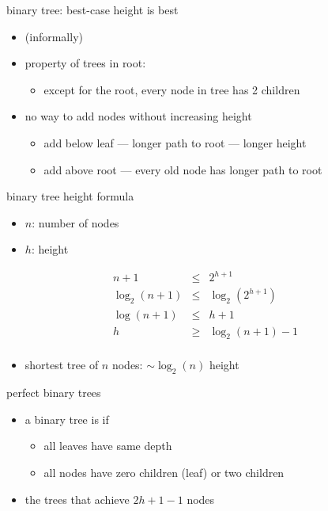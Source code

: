 \begin{frame}{binary tree: best-case height is best}
\begin{itemize}
\item (informally)
\item property of trees in root:
    \begin{itemize}
        \item except for the root, every node in tree has 2 children
    \end{itemize}
\item no way to add nodes without increasing height
    \begin{itemize}
    \item add below leaf --- longer path to root --- longer height
    \item add above root --- every old node has longer path to root
    \end{itemize}
\end{itemize}
\end{frame}


\begin{frame}{binary tree height formula}
    \begin{itemize}
    \item $n$: number of nodes
    \item $h$: height
    \end{itemize}
\begin{eqnarray*}
    n + 1 &\le& 2^{h+1} \\
    \log_2(n+1) &\le& \log_2\left(2^{h+1}\right) \\
    \log(n+1) &\le& h+1 \\
    h &\ge& \log_2\left(n+1\right)-1 \\
\end{eqnarray*}
    \begin{itemize}
    \item shortest tree of $n$ nodes: $\sim \log_2(n)$ height
    \end{itemize}
\end{frame}

\begin{frame}{perfect binary trees}
    \begin{itemize}
    \item a binary tree is  if
        \begin{itemize}
        \item all leaves have same depth
        \item all nodes have zero children (leaf) or two children
        \end{itemize}
    \item {} the trees that achieve $2{h+1}-1$ nodes
    \end{itemize}
\end{frame}
